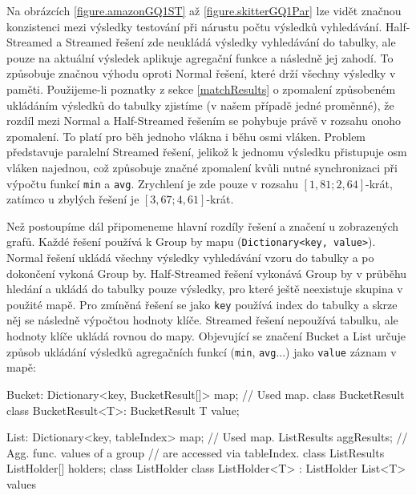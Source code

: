 Na obrázcích \ref{figure.amazonGQ1ST} až \ref{figure.skitterGQ1Par} lze vidět značnou konzistenci mezi výsledky testování při nárustu počtu výsledků vyhledávání.
Half-Streamed a Streamed řešení zde neukládá výsledky vyhledávání do tabulky, ale pouze na aktuální výsledek aplikuje agregační funkce a následně jej zahodí.
To způsobuje značnou výhodu oproti Normal řešení, které drží všechny výsledky v paměti.
Použijeme-li poznatky z sekce \ref{matchResults} o zpomalení způsobeném ukládáním výsledků do tabulky zjistíme (v našem případě jedné proměnné), že rozdíl mezi Normal a Half-Streamed řešením se pohybuje právě v rozsahu onoho zpomalení.
To platí pro běh jednoho vlákna i běhu osmi vláken. 
Problem představuje paralelní Streamed řešení, jelikož k jednomu výsledku přistupuje osm vláken najednou, což způsobuje značné zpomalení kvůli nutné synchronizaci při výpočtu funkcí \verb+min+ a \verb+avg+. 
Zrychlení je zde pouze v rozsahu $[1,81; 2,64]$-krát, zatímco u zbylých řešení je $[3,67; 4,61]$-krát.

Než postoupíme dál připomeneme hlavní rozdíly řešení a značení u zobrazených grafů. 
Každé řešení používá k Group by mapu (\verb+Dictionary<key, value>+).
Normal řešení ukládá všechny výsledky vyhledávání vzoru do tabulky a po dokončení vykoná Group by. 
Half-Streamed řešení vykonává Group by v průběhu hledání a ukládá do tabulky pouze výsledky, pro které ještě neexistuje skupina v použité mapě.
Pro zmíněná řešení se jako \verb+key+ používá index do tabulky a skrze něj se následně výpočtou hodnoty klíče.
Streamed řešení nepoužívá tabulku, ale hodnoty klíče ukládá rovnou do mapy. 
Objevující se značení Bucket a List určuje způsob ukládání výsledků agregačních funkcí (\verb+min+, \verb+avg+...) jako \verb+value+ záznam v mapě:

\begin{code}
Bucket:
Dictionary<key, BucketResult[]> map; // Used map.
class BucketResult {}
class BucketResult<T>: BucketResult { T value; }

List:
Dictionary<key, tableIndex> map; // Used map.
ListResults aggResults; // Agg. func. values of a group 
                        // are accessed via tableIndex.
class ListResults { ListHolder[] holders; }
class ListHolder {}
class ListHolder<T> : ListHolder { List<T> values }
\end{code}

